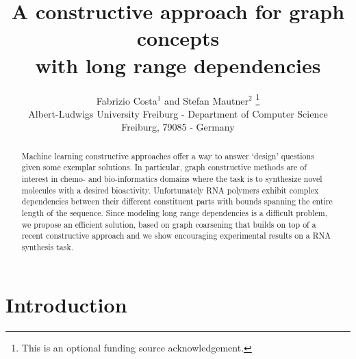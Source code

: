 \documentclass[a4paper]{esannV2}
\begin{document}
\title{A constructive approach for graph concepts\\with long range dependencies}

\author{Fabrizio Costa$^1$ and Stefan Mautner$^2$
%
\thanks{This is an optional funding source acknowledgement.}
%
\vspace{.3cm}\\
%
Albert-Ludwigs University Freiburg - Department of Computer Science\\
Freiburg, 79085 - Germany \\
%
}




  


\maketitle

\begin{abstract}
Machine learning constructive approaches offer a way to answer
`design' questions given some exemplar solutions.  In particular,
graph constructive methods are of interest in chemo- and bio-informatics
domains where the task is to synthesize novel molecules with a desired
bioactivity. Unfortunately RNA polymers exhibit complex dependencies between
their different constituent parts with bounds spanning the entire length of
the sequence. Since modeling long range dependencies is a difficult problem,
we propose an efficient solution, based on graph coarsening that builds on top
of a recent constructive approach and we show encouraging experimental results
on a RNA synthesis task.
\end{abstract}



\section{Introduction}
\end{document}
